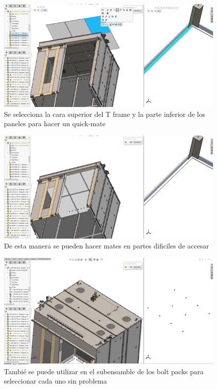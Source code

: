 \documentclass[12pt,letterpaper,final]{report}
\begin{document}
\begin{figure}[H]
	\centering
	\includegraphics[width=0.85\linewidth, height=0.5\textheight,keepaspectratio]{Imagenes/solidworks_componentpreview_05}
	\caption{Se selecciona la cara superior del T frame y la parte inferior de los paneles para hacer un quick-mate}
	\label{fig:solidworkscomponentpreview05}
\end{figure}

\begin{figure}[H]
	\centering
	\includegraphics[width=0.85\linewidth, height=0.5\textheight,keepaspectratio]{Imagenes/solidworks_componentpreview_06}
	\caption{De esta manera se pueden hacer mates en partes dificiles de accesar}
	\label{fig:solidworkscomponentpreview06}
\end{figure}

\begin{figure}[H]
	\centering
	\includegraphics[width=0.85\linewidth, height=0.5\textheight,keepaspectratio]{Imagenes/solidworks_componentpreview_07}
	\caption{Tambié se puede utilizar en el subensamble de los bolt packs para seleccionar cada uno sin problema}
	\label{fig:solidworkscomponentpreview07}
\end{figure}
\end{document}
